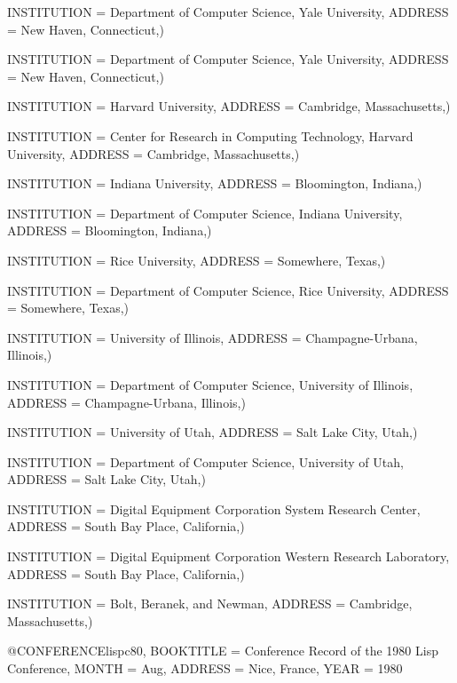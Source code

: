     INSTITUTION = {Department of Computer Science, Yale University},
    ADDRESS = {New Haven, Connecticut},)
    
    INSTITUTION = {Department of Computer Science, Yale University},
    ADDRESS = {New Haven, Connecticut},)

    INSTITUTION = {Harvard University},
    ADDRESS = {Cambridge, Massachusetts},)

    INSTITUTION = {Center for Research in Computing Technology,
    		   Harvard University},
    ADDRESS = {Cambridge, Massachusetts},)
        
    INSTITUTION = {Indiana University},
    ADDRESS = {Bloomington, Indiana},)
    
    INSTITUTION = {Department of Computer Science, Indiana University},
    ADDRESS = {Bloomington, Indiana},)
    
    INSTITUTION = {Rice University},
    ADDRESS = {Somewhere, Texas},)
    
    INSTITUTION = {Department of Computer Science, Rice University},
    ADDRESS = {Somewhere, Texas},)

    INSTITUTION = {University of Illinois},
    ADDRESS = {Champagne-Urbana, Illinois},)
    
    INSTITUTION = {Department of Computer Science, University of Illinois},
    ADDRESS = {Champagne-Urbana, Illinois},)

    INSTITUTION = {University of Utah},
    ADDRESS = {Salt Lake City, Utah},)
    
    INSTITUTION = {Department of Computer Science, University of Utah},
    ADDRESS = {Salt Lake City, Utah},)

       	INSTITUTION = {Digital Equipment Corporation System Research Center}, 
 	ADDRESS = {South Bay Place, California},)
    
    INSTITUTION = {Digital Equipment Corporation Western Research Laboratory},
    ADDRESS = {South Bay Place, California},)        
    
    INSTITUTION = {Bolt, Beranek, and Newman},
    ADDRESS = {Cambridge, Massachusetts},)    


@CONFERENCE{lispc80,
    BOOKTITLE = {Conference Record of the 1980 Lisp Conference},
    MONTH = Aug,
    ADDRESS = {Nice, France},
    YEAR = {1980}}



